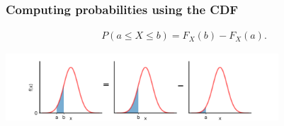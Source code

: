 \documentclass[9pt]{beamer}
\begin{document}
\begin{frame}
\frametitle{Computing probabilities using the CDF}



\vspace{-.7cm}

\begin{align*}
P(a \leq X \leq b) = F_X(b) - F_X(a).
\end{align*} 


\vspace{-.4cm}

\center \includegraphics[height=2.5cm]{images/normal_ab_a_b.png}

\vspace{0cm}




%

\end{frame}
\end{document}
